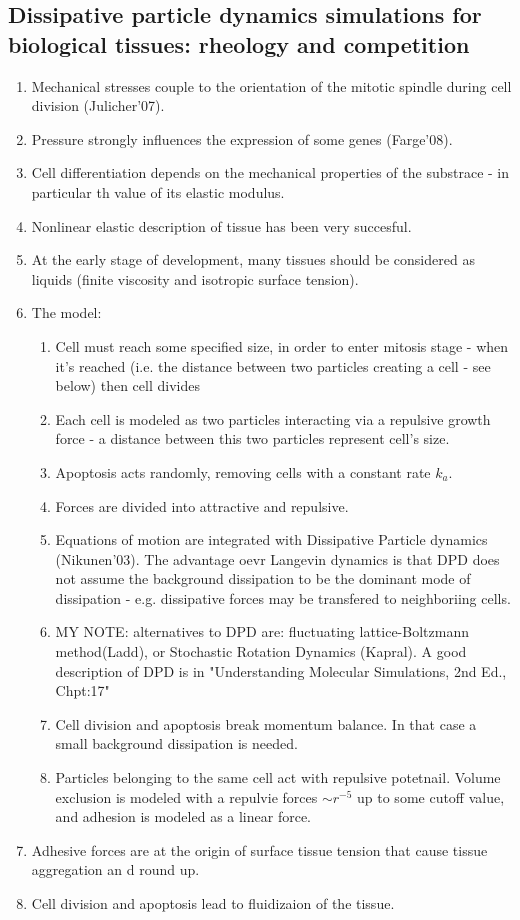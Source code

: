 \documentclass[10pt,a4paper]{article}
\begin{document}
\subsection{Dissipative particle dynamics simulations for biological tissues: rheology and competition \cite{elgeti:11}}
\begin{enumerate}
 \item Mechanical stresses couple to the orientation of the mitotic spindle during cell division (Julicher'07).
 \item Pressure strongly influences the expression of some genes (Farge'08).
 \item Cell differentiation depends on the mechanical properties of the substrace - in particular th value of its elastic modulus.
 \item Nonlinear elastic description of tissue has been very succesful.
 \item At the early stage of development, many tissues should be considered as liquids (finite viscosity and isotropic surface tension).
 \item The model:
 \begin{enumerate}
  \item Cell must reach some specified size, in order to enter mitosis stage - when it's reached (i.e. the distance between two particles creating a cell - see below) then cell divides
  \item Each cell is modeled as two particles interacting via a repulsive growth force - a distance between this two particles represent cell's size.
  \item Apoptosis acts randomly, removing cells with a constant rate $k_a$.
  \item Forces are divided into attractive and repulsive.
  \item Equations of motion are integrated with Dissipative Particle dynamics (Nikunen'03).
  The advantage oevr Langevin dynamics is that DPD does not assume  the background dissipation to be the dominant mode of dissipation - e.g. dissipative forces may be transfered to neighboriing cells.
  \item MY NOTE: alternatives to DPD are: fluctuating lattice-Boltzmann method(Ladd), or Stochastic Rotation Dynamics (Kapral). 
  A good description of DPD is in "Understanding Molecular Simulations, 2nd Ed., Chpt:17"
  \item Cell division and apoptosis break momentum balance. In that case a small background dissipation is needed.
  \item Particles belonging to the same cell act with repulsive potetnail. 
  Volume exclusion is modeled with a repulvie forces $\sim r^{-5}$ up to some cutoff value, and adhesion is modeled as a linear force. 
 \end{enumerate}
 \item Adhesive forces are at the origin of surface tissue tension that cause tissue aggregation an d round up.
 \item Cell division and apoptosis lead to fluidizaion of the tissue. 
\end{enumerate}
\end{document}
